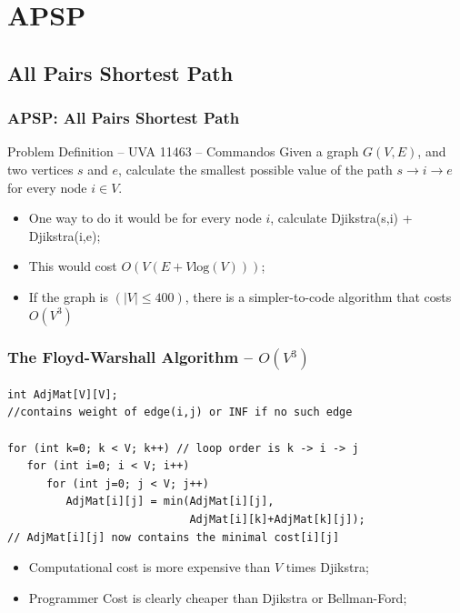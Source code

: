 \documentclass{beamer}
\begin{document}
\section{APSP}
\subsection{All Pairs Shortest Path}
\begin{frame}
  \frametitle{APSP: All Pairs Shortest Path}

  {\smaller
  \begin{block}{Problem Definition -- UVA 11463 -- Commandos}
    Given a graph $G(V,E)$, and two vertices $s$ and
    $e$, calculate the smallest possible value of the path $s
    \rightarrow i \rightarrow e$ for every node $i \in V$.
  \end{block}

  \begin{itemize}
  \item One way to do it would be for every node $i$, calculate
    Djikstra(s,i) + Djikstra(i,e);
  \item This would cost $O(V(E+V\text{log}(V)))$;
  \item If the graph is  $(|V| \leq 400)$, there is a
    simpler-to-code algorithm that costs $O(V^3)$
  \end{itemize}
  }
\end{frame}

\begin{frame}
  \frametitle{The Floyd-Warshall Algorithm -- $O(V^3)$}

{\smaller

  \begin{exampleblock}{}
\begin{verbatim}
int AdjMat[V][V]; 
//contains weight of edge(i,j) or INF if no such edge

for (int k=0; k < V; k++) // loop order is k -> i -> j
   for (int i=0; i < V; i++)
      for (int j=0; j < V; j++)
         AdjMat[i][j] = min(AdjMat[i][j],
                            AdjMat[i][k]+AdjMat[k][j]);
// AdjMat[i][j] now contains the minimal cost[i][j]
\end{verbatim}
  \end{exampleblock}

  \begin{itemize}
  \item Computational cost is more expensive than $V$ times
    Djikstra;
  \item \alert{Programmer Cost} is clearly cheaper than Djikstra
    or Bellman-Ford;
  \end{itemize}
}
\end{frame}
\end{document}
